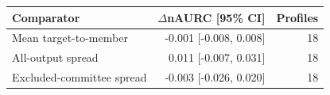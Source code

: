 \begin{tabular}{lrr}
\toprule
Comparator & $\Delta$nAURC [95\% CI] & Profiles \\
\midrule
Mean target-to-member & -0.001 [-0.008, 0.008] & 18 \\
All-output spread & 0.011 [-0.007, 0.031] & 18 \\
Excluded-committee spread & -0.003 [-0.026, 0.020] & 18 \\
\bottomrule
\end{tabular}
